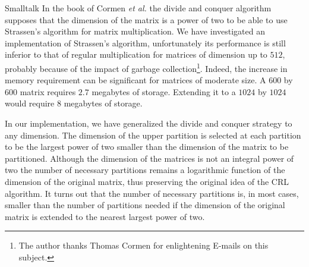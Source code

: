\begin{displaycode}{Smalltalk}
In the book of Cormen \textit{et al.} \cite{CorLeiRiv} the divide and
conquer algorithm supposes that the dimension of the matrix is a
power of two to be able to use Strassen's algorithm for matrix
multiplication. We have investigated an implementation of
Strassen's algorithm, unfortunately its performance is still
inferior to that of regular multiplication for matrices of
dimension up to $512$, probably because of the impact of garbage
collection\footnote{The author thanks Thomas Cormen for
enlightening E-mails on this subject.}. Indeed, the increase in
memory requirement can be significant for matrices of moderate
size. A $600$ by $600$ matrix requires $2.7$ megabytes of storage.
Extending it to a $1024$ by $1024$ would require $8$ megabytes of
storage.

 In our implementation, we have
generalized the divide and conquer strategy to any dimension. The
dimension of the upper partition is selected at each partition to
be the largest power of two smaller than the dimension of the
matrix to be partitioned. Although the dimension of the matrices
is not an integral power of two the number of necessary partitions
remains a logarithmic function of the dimension of the original
matrix, thus preserving the original idea of the CRL algorithm. It
turns out that the number of necessary partitions is, in most
cases, smaller than the number of partitions needed if the
dimension of the original matrix is extended to the nearest
largest power of two.


\end{displaycode}
